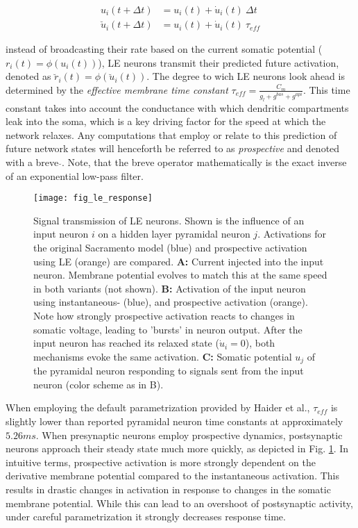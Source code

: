 \begin{align}
  u_i(t+ \Delta t)          & = u_i(t) + \dot{u}_i(t) \ \Delta t \label{eq-r-t-sacramento} \\
  \breve{u}_i(t + \Delta t) & = u_i(t) + \dot{u}_i(t) \ \tau_{eff} \label{eq-r-t-haider}
\end{align}

instead of broadcasting their rate based on the current somatic potential ($r_i(t) = \phi(u_i(t))$), LE neurons transmit
their predicted future activation, denoted as $\breve{r}_i(t) = \phi(\breve{u}_i(t))$. The degree to wich LE neurons
look ahead is determined by the \textit{effective membrane time constant} $\tau_{eff} = \frac{C_m}{g_l + g^{bas} +
g^{api}}$. This time constant takes into account the conductance with which dendritic compartments leak into the soma,
which is a key driving factor for the speed at which the network relaxes. Any computations that employ or relate to this
prediction of future network states will henceforth be referred to as \textit{prospective} and denoted with a breve
$\breve{}$. Note, that the breve operator mathematically is the exact inverse of an exponential low-pass filter.


\begin{figure}[h!]
  \centering
  \texttt{[image: fig\_le\_response]}
  \caption[Signal transmission of LE neurons]{Signal transmission of LE neurons. Shown is the influence of an input
    neuron $i$ on a hidden layer pyramidal neuron $j$. Activations for the original Sacramento model (blue) and
    prospective activation using LE (orange) are compared. \textbf{A:} Current injected into the input neuron. Membrane
    potential evolves to match this at the same speed in both variants (not shown). \textbf{B:} Activation of the input
    neuron using instantaneous- (blue), and prospective activation (orange). Note how strongly prospective activation
    reacts to changes in somatic voltage, leading to 'bursts' in neuron output. After the input neuron has reached its
    relaxed state ($\dot{u}_i = 0$), both mechanisms evoke the same activation. \textbf{C:} Somatic potential $u_j$ of
    the pyramidal neuron responding to signals sent from the input neuron (color scheme as in B).}
  \label{fig-comparison-le}
\end{figure}

When employing the default parametrization provided by Haider et al., $\tau_{eff}$ is slightly
lower than reported pyramidal neuron time constants \citep{McCormick1985} at approximately $5.26ms$. When presynaptic
neurons employ prospective dynamics, postsynaptic neurons approach their steady state much more quickly, as depicted in
Fig. \ref{fig-comparison-le}. In intuitive terms, prospective activation is more strongly dependent on the derivative
membrane potential compared to the instantaneous activation. This results in drastic changes in activation in response
to changes in the somatic membrane potential. While this can lead to an overshoot of postsynaptic activity, under
careful parametrization it strongly decreases response time.


